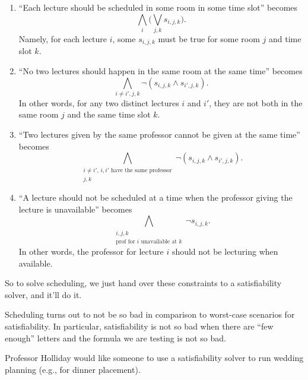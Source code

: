 \begin{enumerate}
	\item ``Each lecture should be scheduled in some room in some time slot'' becomes
	\[\bigwedge_i\Bigg(\bigvee_{j,k}s_{i,j,k}\Bigg).\]
	Namely, for each lecture $i$, some $s_{i,j,k}$ must be true for some room $j$ and time slot $k$.
	\item ``No two lectures should happen in the same room at the same time'' becomes
	\[\bigwedge_{i\ne i',j,k}\lnot(s_{i,j,k}\land s_{i',j,k}).\]
	In other words, for any two distinct lectures $i$ and $i'$, they are not both in the same room $j$ and the same time slot $k$.
	\item ``Two lectures given by the same professor cannot be given at the same time'' becomes
	\[\bigwedge_{\substack{i\ne i',\,i,i'\text{ have the same professor}\\j,k}}\lnot(s_{i,j,k}\land s_{i',j,k}).\]
	\item ``A lecture should not be scheduled at a time when the professor giving the lecture is unavailable'' becomes
	\[\bigwedge_{\substack{i,j,k\\\text{prof for }i\text{ unavailable at }k}}\lnot s_{i,j,k}.\]
	In other words, the professor for lecture $i$ should not be lecturing when available.
\end{enumerate}
So to solve scheduling, we just hand over these constraints to a satisfiability solver, and it'll do it.
\begin{remark}
	Scheduling turns out to not be so bad in comparison to worst-case scenarios for satisfiability. In particular, satisfiability is not so bad when there are ``few enough'' letters and the formula we are testing is not so bad.
\end{remark}
\begin{remark}
	Professor Holliday would like someone to use a satisfiability solver to run wedding planning (e.g., for dinner placement).
\end{remark}